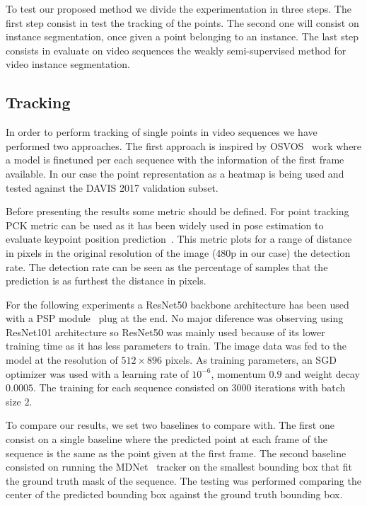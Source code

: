 To test our proposed method we divide the experimentation in three steps.
The first step consist in test the tracking of the points.
The second one will consist on instance segmentation, once given a point belonging to an instance.
The last step consists in evaluate on video sequences the weakly semi-supervised method for video instance segmentation.

\subsection{Tracking}

In order to perform tracking of single points in video sequences we have performed two approaches.
The first approach is inspired by OSVOS~\cite{caelles2017one} work where a model is finetuned per each sequence with the information of the first frame available.
In our case the point representation as a heatmap is being used and tested against the DAVIS 2017 validation subset.

Before presenting the results some metric should be defined.
For point tracking PCK metric can be used as it has been widely used in pose estimation to evaluate keypoint position prediction~\cite{sapp2013modec}.
This metric plots for a range of distance in pixels in the original resolution of the image (480p in our case) the detection rate. The detection rate can be seen as the percentage of samples that the prediction is as furthest the distance in pixels.


For the following experiments a ResNet50 backbone architecture has been used with a PSP module~\cite{zhao2017pyramid} plug at the end.
No major diference was observing using ResNet101 architecture so ResNet50 was mainly used because of its lower training time as it has less parameters to train.
The image data was fed to the model at the resolution of $512 \times 896$ pixels.
As training parameters, an SGD optimizer was used with a learning rate of $10^{-6}$, momentum $0.9$ and weight decay $0.0005$. The training for each sequence consisted on 3000 iterations with batch size $2$.

To compare our results, we set two baselines to compare with.
The first one consist on a single baseline where the predicted point at each frame of the sequence is the same as the point given at the first frame.
The second baseline consisted on running the MDNet~\cite{nam2016learning} tracker on the smallest bounding box that fit the ground truth mask of the sequence. The testing was performed comparing the center of the predicted bounding box against the ground truth bounding box.


